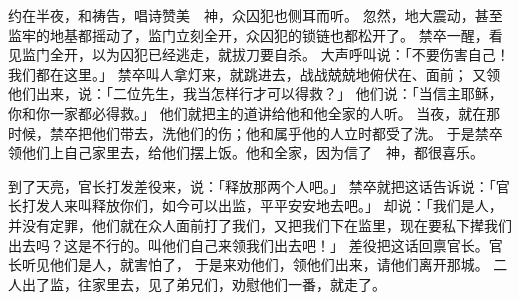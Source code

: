 {\par }{\PP {}约在半夜，{}和{}祷告，唱诗赞美　神，众囚犯也侧耳而听。
忽然，地大震动，甚至监牢的地基都摇动了，监门立刻全开，众囚犯的锁链也都松开了。
禁卒一醒，看见监门全开，以为囚犯已经逃走，就拔刀要自杀。
大声呼叫说：「不要伤害自己！我们都在这里。」
禁卒叫人拿灯来，就跳进去，战战兢兢地俯伏在{}、{}面前；
又领他们出来，说：「二位先生，我当怎样行才可以得救？」
他们说：「当信主耶稣，你和你一家都必得救。」
他们就把主的道讲给他和他全家的人听。
当夜，就在那时候，禁卒把他们带去，洗他们的伤；他和属乎他的人立时都受了洗。
于是禁卒领他们上自己家里去，给他们摆上饭。他和全家，因为信了　神，都很喜乐。
\par }{\PP {}到了天亮，官长打发差役来，说：「释放那两个人吧。」
禁卒就把这话告诉{}说：「官长打发人来叫释放你们，如今可以出监，平平安安地去吧。」
却说：「我们是{}人，并没有定罪，他们就在众人面前打了我们，又把我们下在监里，现在要私下撵我们出去吗？这是不行的。叫他们自己来领我们出去吧！」
差役把这话回禀官长。官长听见他们是{}人，就害怕了，
于是来劝他们，领他们出来，请他们离开那城。
二人出了监，往{}家里去，见了弟兄们，劝慰他们一番，就走了。

}

